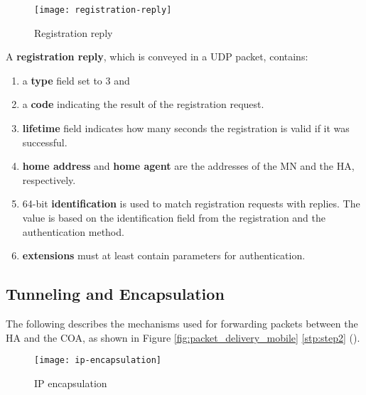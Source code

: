	
	\begin{figure}[hb!]
	\centering
	\texttt{[image: registration-reply]}
	\caption{Registration reply}\label{fig:registration-reply}
	\end{figure}
	
A \textbf{registration reply}, which is conveyed in a UDP packet, contains:
\begin{multicols}{2}
\begin{enumerate}
	\item a \textbf{type} field set to 3 and
	
	\item a \textbf{code} indicating the result of the registration request.
	
	\item \textbf{lifetime} field indicates how many seconds the registration is valid if it was successful.
	
	\item \textbf{home address} and \textbf{home agent} are the addresses of the MN and the HA, respectively.
	
	\item 64-bit \textbf{identification} is used to match registration requests with replies. The value is based on the identification field from the registration and the authentication method.
	
	\item \textbf{extensions} must at least contain parameters for authentication.
	
\end{enumerate}
\end{multicols}

\subsection{Tunneling and Encapsulation}
The following describes the mechanisms used for forwarding packets between the HA and the COA, as shown in Figure \ref{fig:packet_delivery_mobile} \ref{stp:step2} (). 


\begin{figure}[hpt]
	\centering
	\texttt{[image: ip-encapsulation]}
	\caption{IP encapsulation}\label{fig:ip_encapsulation}
\end{figure}

